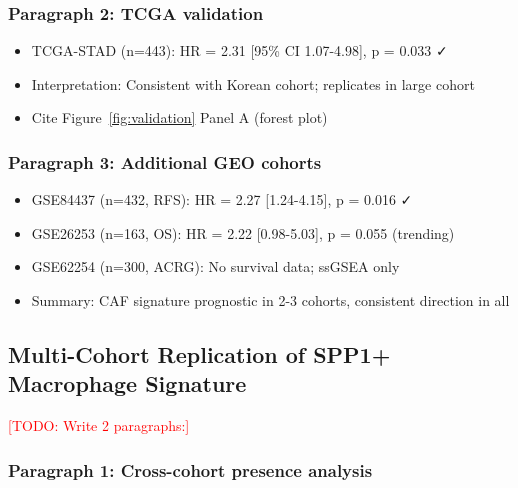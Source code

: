 \documentclass[12pt,oneside]{article}
\newcommand{\TODO}[1]{\textcolor{red}{[TODO: #1]}}
\newcommand{\FIG}[1]{Figure~\ref{fig:#1}}
\begin{document}
\subsubsection*{Paragraph 2: TCGA validation}
\begin{itemize}
    \item TCGA-STAD (n=443): HR = 2.31 [95\% CI 1.07-4.98], p = 0.033 ✓
    \item Interpretation: Consistent with Korean cohort; replicates in large cohort
    \item Cite \FIG{validation} Panel A (forest plot)
\end{itemize}

\subsubsection*{Paragraph 3: Additional GEO cohorts}
\begin{itemize}
    \item GSE84437 (n=432, RFS): HR = 2.27 [1.24-4.15], p = 0.016 ✓
    \item GSE26253 (n=163, OS): HR = 2.22 [0.98-5.03], p = 0.055 (trending)
    \item GSE62254 (n=300, ACRG): No survival data; ssGSEA only
    \item Summary: CAF signature prognostic in 2-3 cohorts, consistent direction in all
\end{itemize}

\subsection{Multi-Cohort Replication of SPP1+ Macrophage Signature}
\TODO{Write 2 paragraphs:}

\subsubsection*{Paragraph 1: Cross-cohort presence analysis}
\end{document}
